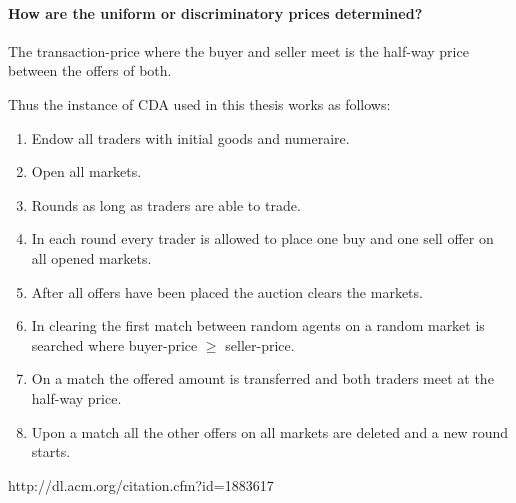 \documentclass[../Bachelorarbeit.tex]{subfiles}
\begin{document}
\paragraph{How are the uniform or discriminatory prices determined?} The \gls{transaction-price} where the buyer and seller meet is the half-way price between the offers of both.

Thus the instance of CDA used in this thesis works as follows:

\begin{enumerate}
\item Endow all traders with initial goods and numeraire.
\item Open all markets.
\item Rounds as long as traders are able to trade.
\item In each round every trader is allowed to place one buy and one sell offer on all opened markets.
\item After all offers have been placed the auction clears the markets.
\item In clearing the first match between random agents on a random market is searched where buyer-price $\geq$ seller-price.
\item On a match the offered amount is transferred and both traders meet at the half-way price.
\item Upon a match all the other offers on all markets are deleted and a new round starts.
\end{enumerate}

\cite{Parsons2006}
http://dl.acm.org/citation.cfm?id=1883617
\cite{GodeSunder1993}
\end{document}
